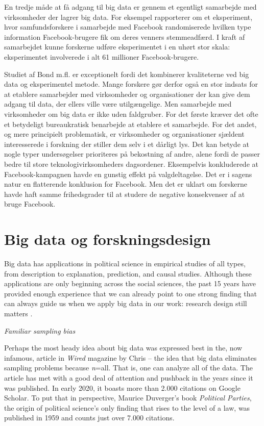 \documentclass[12pt,]{article}
\begin{document}
En tredje måde at få adgang til big data er gennem et egentligt
samarbejde med virksomheder der lagrer big data. For eksempel
rapporterer \citet{bond2012} om et eksperiment, hvor samfundsforskere i
samarbejde med Facebook randomiserede hvilken type information
Facebook-brugere fik om deres venners stemmeadfærd. I kraft af
samarbejdet kunne forskerne udføre eksperimentet i en uhørt stor skala:
eksperimentet involverede i alt 61 millioner Facebook-brugere.

Studiet af Bond m.fl. er exceptionelt fordi det kombinerer kvaliteterne
ved big data og eksperimentel metode. Mange forskere gør derfor også en
stor indsats for at etablere samarbejder med virksomheder og
organisationer der kan give dem adgang til data, der ellers ville være
utilgængelige. Men samarbejde med virksomheder om big data er ikke uden
faldgruber. For det første kræver det ofte et betydeligt bureaukratisk
benarbejde at etablere et samarbejde. For det andet, og mere principielt
problematisk, er virksomheder og organisationer sjældent interesserede i
forskning der stiller dem selv i et dårligt lys. Det kan betyde at nogle
typer undersøgelser prioriteres på bekostning af andre, alene fordi de
passer bedre til store teknologivirksomheders dagsordener. Eksempelvis
konkluderede \citet{bond2012} at Facebook-kampagnen havde en gunstig
effekt på valgdeltagelse. Det er i sagens natur en flatterende
konklusion for Facebook. Men det er uklart om forskerne havde haft samme
frihedsgrader til at studere de negative konsekvenser af at bruge
Facebook.

\hypertarget{big-data-og-forskningsdesign}{%
\section{Big data og
forskningsdesign}\label{big-data-og-forskningsdesign}}

Big data has applications in political science in empirical studies of
all types, from description to explanation, prediction, and causal
studies. Although these applications are only beginning across the
social sciences, the past 15 years have provided enough experience that
we can already point to one strong finding that can always guide us when
we apply big data in our work: research design still matters
\citetext{\citealp[see][p.~13]{toshkov16}; \citealp{CG15}}.

\emph{Familiar sampling bias}

Perhaps the most heady idea about big data was expressed best in the,
now infamous, article in \emph{Wired} magazine by Chris
\citet{anderson08} -- the idea that big data eliminates sampling
problems because \emph{n}=all. That is, one can analyze all of the data.
The article has met with a good deal of attention and pushback in the
years since it was published. In early 2020, it boasts more than 2.000
citations on Google Scholar. To put that in perspective, Maurice
Duverger's book \emph{Political Parties}, the origin of political
science's only finding that rises to the level of a law, was published
in 1959 and counts just over 7.000 citations.
\end{document}
